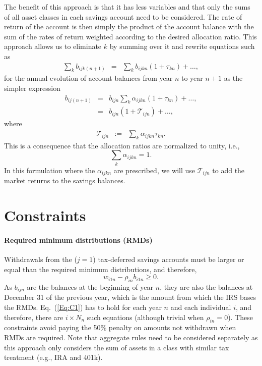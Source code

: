\documentclass{report}[fleqn,11pt]
\begin{document}
The benefit of this approach is that it has less variables and that only the sums of
all asset classes in each savings account need to be considered. The rate of return
of the account is then simply the product of the account balance with the sum of
the rates of return weighted according to the desired allocation ratio.
This approach allows us to eliminate $k$ by summing over it and rewrite
equations such as
\begin{eqnarray}
	\sum_k b_{ijk(n+1)} &=& \sum_k b_{ijkn} (1 + \tau_{kn}) + \ldots ,
\end{eqnarray}
for the annual evolution of account balances from year $n$ to year $n+1$
as the simpler expression 
\begin{eqnarray}
	b_{ij(n+1)} &=& b_{ijn} \sum_k \alpha_{ijkn} (1 + \tau_{kn}) + \ldots ,\nonumber \\
		  &=& b_{ijn} (1 + \mathcal{T}_{ijn}) + \ldots ,
\end{eqnarray}
where
\begin{eqnarray}
	\label{Eq:Tau1}
	\mathcal{T}_{ijn} &:=& \sum_k \alpha_{ijkn} \tau_{kn}.
\end{eqnarray}
This is a consequence that the allocation ratios are normalized to unity, i.e.,
\begin{equation}
	\sum_k \alpha_{ijkn} = 1.
\end{equation}
In this formulation where the $\alpha_{ijkn}$ are prescribed,
we will use $\mathcal{T}_{ijn}$ to
add the market returns to the savings balances.

\section{Constraints}
\paragraph*{Required minimum distributions (RMDs)}
	Withdrawals from the ($j=1$) tax-deferred savings accounts must be larger
	or equal than the required minimum distributions, and therefore,
	\begin{equation}
		\label{Eq:C1}
		w_{i1n} -  \rho_{in}b_{i1n} \geq 0.
	\end{equation}
	As $b_{ijn}$ are the balances at the beginning of year $n$, they are also the balances
	at December 31 of the previous year, which is the amount from which the IRS bases the RMDs.
	Eq.~(\ref{Eq:C1}) has to hold for each year $n$ and each individual $i$, and therefore, there
	are $i\times N_n$ such equations (although trivial when $\rho_{in} = 0$).
	These constraints avoid paying the 50\% penalty
	on amounts not withdrawn when RMDs are required.
	Note that aggregate rules need to be considered separately as this approach only considers
	the sum of assets in a class with similar tax treatment (e.g., IRA and 401k).
\end{document}
